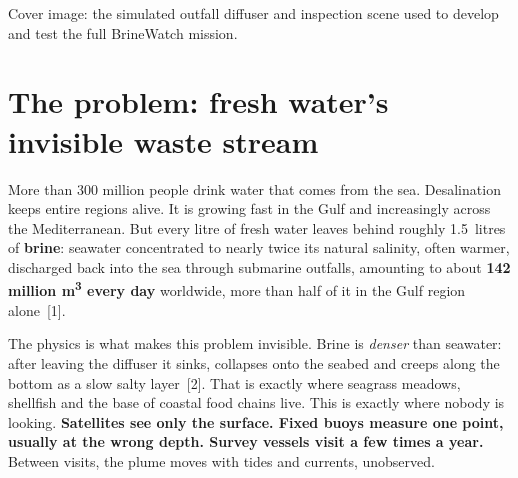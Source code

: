 \documentclass[10pt,a4paper]{article}
\newcommand{\keyword}[1]{\textbf{\color{deepblue}#1}}
\begin{document}
\vfill
{\sffamily\footnotesize\color{muted}Cover image: the simulated outfall diffuser and inspection scene used to develop and
test the full BrineWatch mission.}

\clearpage
\setcounter{section}{0}
\section{The problem: fresh water's invisible waste stream}

More than 300 million people drink water that comes from the sea. Desalination keeps entire
regions alive. It is growing fast in the Gulf and increasingly across the Mediterranean.
But every litre of fresh water leaves behind roughly 1.5~litres of \keyword{brine}: seawater
concentrated to nearly twice its natural salinity, often warmer, discharged back into the sea
through submarine outfalls, amounting to about \keyword{142 million m\textsuperscript{3} every day}
worldwide, more than half of it in the Gulf region alone~[1].

The physics is what makes this problem invisible. Brine is \emph{denser} than seawater: after
leaving the diffuser it sinks, collapses onto the seabed and creeps along the bottom as a slow
salty layer~[2]. That is exactly where seagrass meadows, shellfish and the base of coastal food
chains live. This is exactly where nobody is looking. \keyword{Satellites see only the surface.
Fixed buoys measure one point, usually at the wrong depth. Survey vessels visit a few times a
year.} Between visits, the plume moves with tides and currents, unobserved.
\end{document}
